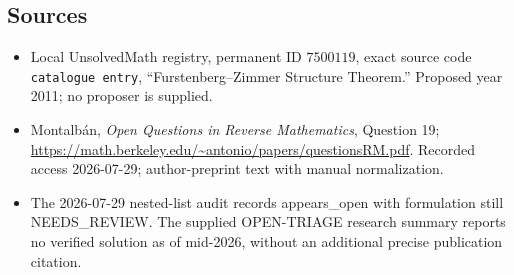 \documentclass[11pt]{article}
\begin{document}
\subsection{Sources}
\begin{itemize}
\item Local UnsolvedMath registry, permanent ID \(7500119\), exact source code \texttt{catalogue entry}, ``Furstenberg--Zimmer Structure Theorem.'' Proposed year 2011; no proposer is supplied.
\item Montalbán, \emph{Open Questions in Reverse Mathematics}, Question 19; \url{https://math.berkeley.edu/~antonio/papers/questionsRM.pdf}. Recorded access 2026-07-29; author-preprint text with manual normalization.
\item The 2026-07-29 nested-list audit records appears\_open with formulation still NEEDS\_REVIEW. The supplied OPEN-TRIAGE research summary reports no verified solution as of mid-2026, without an additional precise publication citation.
\end{itemize}
\end{document}
